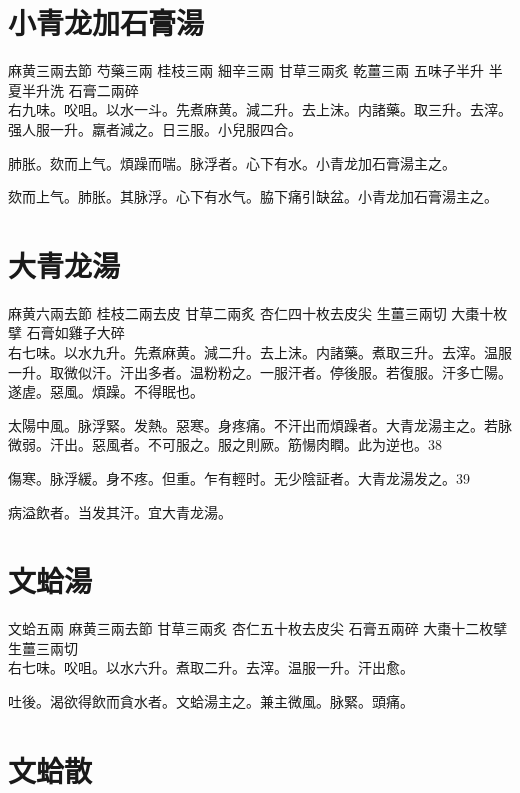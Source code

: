 \section{小青龙加石膏湯}

麻黄{\scriptsize 三兩去節} 芍藥{\scriptsize 三兩} 桂枝{\scriptsize 三兩} 細辛{\scriptsize 三兩} 甘草{\scriptsize 三兩炙} 乾薑{\scriptsize 三兩} 五味子{\scriptsize 半升} 半夏{\scriptsize 半升洗} 石膏{\scriptsize 二兩碎}\\
右九味。㕮咀。以水一斗。先煮麻黄。減二升。去上沫。内諸藥。取三升。去滓。强人服一升。羸者減之。日三服。小兒服四合。

肺胀。欬而上气。煩躁而喘。脉浮者。心下有水。小青龙加石膏湯主之。

欬而上气。肺胀。其脉浮。心下有水气。脇下痛引缺盆。小青龙加石膏湯主之。

\section{大青龙湯}

麻黄{\scriptsize 六兩去節} 桂枝{\scriptsize 二兩去皮} 甘草{\scriptsize 二兩炙} 杏仁{\scriptsize 四十枚去皮尖} 生薑{\scriptsize 三兩切} 大棗{\scriptsize 十枚擘} 石膏{\scriptsize 如雞子大碎}\\
右七味。以水九升。先煮麻黄。減二升。去上沫。内諸藥。煮取三升。去滓。温服一升。取微似汗。汗出多者。温粉粉之。一服汗者。停後服。若復服。汗多亡陽。遂虗。惡風。煩躁。不得眠也。

太陽中風。脉浮緊。发熱。惡寒。身疼痛。不汗出而煩躁者。大青龙湯主之。若脉微弱。汗出。惡風者。不可服之。服之則厥。筋愓肉瞤。此为逆也。38

傷寒。脉浮緩。身不疼。但重。乍有輕时。无少陰証者。大青龙湯发之。39

病溢飲{\khaaitp 者}。当发其汗。宜大青龙湯。

\section{文蛤湯}

文蛤{\scriptsize 五兩} 麻黄{\scriptsize 三兩去節} 甘草{\scriptsize 三兩炙} 杏仁{\scriptsize 五十枚去皮尖} 石膏{\scriptsize 五兩碎} 大棗{\scriptsize 十二枚擘} 生薑{\scriptsize 三兩切}\\
右七味。㕮咀。以水六升。煮取二升。去滓。温服一升。汗出愈。

吐後。渴欲得飲而貪水者。文蛤湯主之。兼主微風。脉緊。頭痛。

\section{文蛤散}

